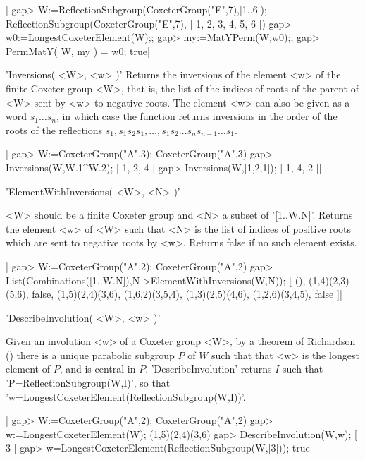 |    gap>  W:=ReflectionSubgroup(CoxeterGroup("E",7),[1..6]);
    ReflectionSubgroup(CoxeterGroup("E",7), [ 1, 2, 3, 4, 5, 6 ])
    gap>  w0:=LongestCoxeterElement(W);;
    gap> my:=MatYPerm(W,w0);;
    gap> PermMatY( W, my ) = w0;
    true|


'Inversions( <W>, <w> )'
Returns  the inversions of the element <w> of the finite Coxeter group <W>,
that  is, the list of the indices of roots of the parent of <W> sent by <w>
to  negative roots. The element <w> can  also be given as a word $s_1\ldots
s_n$,  in which case  the function returns  inversions in the  order of the
roots  of  the  reflections  $s_1,  s_1  s_2  s_1,\ldots,s_1  s_2\ldots s_n
s_{n-1}\ldots s_1$.

|    gap> W:=CoxeterGroup("A",3);
    CoxeterGroup("A",3)
    gap> Inversions(W,W.1^W.2);
    [ 1, 2, 4 ]
    gap> Inversions(W,[1,2,1]);
    [ 1, 4, 2 ]|



'ElementWithInversions( <W>, <N> )'

<W>  should  be  a  finite  Coxeter  group  and <N> a subset of '[1..W.N]'.
Returns  the element  <w> of  <W> such  that <N>  is the  list of indices of
positive roots which are sent to negative roots by <w>. Returns false if no
such element exists.

|    gap> W:=CoxeterGroup("A",2);
    CoxeterGroup("A",2)
    gap> List(Combinations([1..W.N]),N->ElementWithInversions(W,N));
    [ (), (1,4)(2,3)(5,6), false, (1,5)(2,4)(3,6), (1,6,2)(3,5,4),
      (1,3)(2,5)(4,6), (1,2,6)(3,4,5), false ]|


'DescribeInvolution( <W>, <w> )'

Given  an involution <w> of a Coxeter group <W>, by a theorem of Richardson
(\cite{rich82})  there is a unique parabolic  subgroup $P$ of $W$ such that
that   <w>  is  the  longest  element  of  $P$,  and  is  central  in  $P$.
'DescribeInvolution'  returns $I$ such that 'P=ReflectionSubgroup(W,I)', so
that 'w=LongestCoxeterElement(ReflectionSubgroup(W,I))'.

|    gap> W:=CoxeterGroup("A",2);
    CoxeterGroup("A",2)
    gap> w:=LongestCoxeterElement(W);
    (1,5)(2,4)(3,6)
    gap> DescribeInvolution(W,w);
    [ 3 ]
    gap> w=LongestCoxeterElement(ReflectionSubgroup(W,[3]));
    true|

